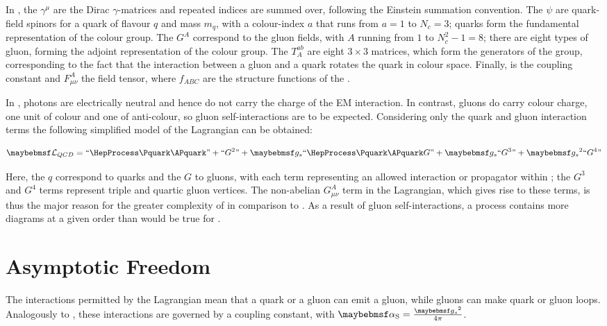 In , the $\gamma^{\mu}$ are the Dirac $\gamma$-matrices and repeated indices are summed over, following the Einstein summation convention.
The $\psi$ are quark-field spinors for a quark of flavour $q$ and mass $m_q$, with a colour-index $a$ that runs from $a = 1$ to $N_c = 3$; quarks form the
fundamental representation of the  colour group.
The $G^A$ correspond to the gluon fields, with $A$ running from $1$ to $N_c^2-1 = 8$; there are eight types of gluon, forming the adjoint representation of the  colour group.
The $T^{ab}_A$ are eight $3 \times 3$ matrices, which form the generators of the  group, corresponding to the fact that the interaction between
a gluon and a quark rotates the quark in colour space.
Finally, \gQCD is the \QCD coupling constant and $F^A_{\mu\nu}$ the field tensor, where $f_{ABC}$ are the structure functions of the .

In \QED, photons are electrically neutral and hence do not carry the charge of the EM interaction.
In contrast, gluons do carry colour charge, one unit of colour and one of anti-colour, so gluon self-interactions are to be expected.
Considering only the quark and gluon interaction terms the following simplified model of the \QCD Lagrangian can be obtained:

\begin{equation}
  \label{eq:bg-theory:qcd_simplified}
  \Lagrangian_{\QCD} = ``\qqbar" + ``G^{2}" + \gQCD``\qqbar G" + \gQCD``G^{3}" + \gQCD^{2}``G^{4}"
\end{equation}

Here, the $q$ correspond to quarks and the $G$ to gluons, with each term representing an allowed interaction or propagator within \QCD; the $G^3$ and $G^4$ terms represent triple and quartic gluon vertices.
The non-abelian $G^A_{\mu\nu}$ term in the Lagrangian, which gives rise to these terms, is thus the major reason for the greater complexity of \QCD in comparison to \QED.
As a result of gluon self-interactions, a \QCD process contains more diagrams at a given order than would be true for \QED.

\section{Asymptotic Freedom}
The interactions permitted by the \QCD Lagrangian mean that a quark or a gluon can emit a gluon, while gluons can make quark or gluon loops.
Analogously to \QED, these interactions are governed by a coupling constant, with $\alphaS = \frac{\gQCD^2}{4\pi}$.

